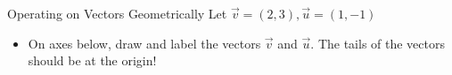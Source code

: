 \begin{exercise}{Operating on Vectors Geometrically}
Let $\vec{v}=(2,3), \vec{u}=(1,-1)$
\begin{itemize}
\vspace{1em}

\item On axes below, draw and label the vectors $\vec{v}$ and $\vec{u}$. The tails of the vectors should be at the origin!

\begin{center}\end{center}
	

\end{itemize}
\end{exercise}
